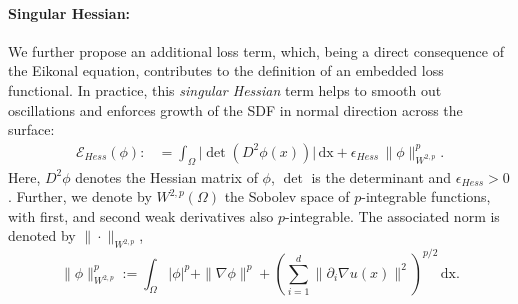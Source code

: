 \documentclass[12pt,openany]{book}
\theoremstyle{plainnormal}
\theoremstyle{remark}
\begin{document}
\paragraph{Singular Hessian:}%
We further propose an additional loss term, which, being a direct consequence of the Eikonal equation, contributes to the definition of an embedded loss functional. In practice, this \emph{singular Hessian} term helps to smooth out oscillations and enforces growth of the SDF in normal direction across the surface: 
\begin{align}\label{loss_Hess}
    \mathcal{E}_{Hess}({\phi}) :&=   \int_\Omega \big|\det(D^2 \phi(x))\big| \,\mathrm{dx} + \epsilon_{Hess}\, \|\phi\|_{W^{2,p}}^p  .
\end{align}
Here, $D^2 \phi$ denotes the Hessian matrix of $\phi$, $\det$ is the determinant and $\epsilon_{Hess} > 0$. Further, we denote by \( W^{2,p}(\Omega) \) the Sobolev space of $p$-integrable functions, with first, and second weak derivatives also \( p \)-integrable. The associated norm is denoted by \( \|\cdot\|_{W^{2,p}} \), $$\|\phi\|^p_{W^{2,p}} :=\int_\Omega |\phi|^p + \|\nabla \phi\|^p + \left( \sum_{i=1}^d \| \partial_i \nabla u(x) \|^2 \right)^{p/2} \, \mathrm{dx}.$$
\end{document}

